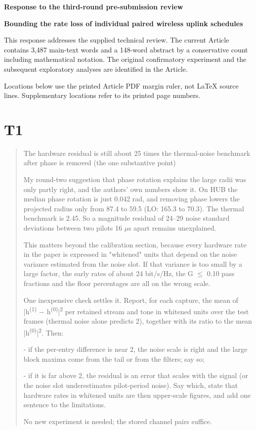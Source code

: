 \documentclass[10pt,letterpaper]{article}
\begin{document}
\begin{center}\Large\bfseries Response to the third-round pre-submission review\end{center}

\textbf{Bounding the rate loss of individual paired wireless uplink schedules}

This response addresses the supplied technical review. The current Article contains 3,487 main-text words and a 148-word abstract by a conservative count including mathematical notation. The original confirmatory experiment and the subsequent exploratory analyses are identified in the Article.

Locations below use the printed Article PDF margin ruler, not LaTeX source lines. Supplementary locations refer to its printed page numbers.

\section*{T1}

\begin{quote}\small The hardware residual is still about 25 times the thermal-noise benchmark after phase is removed (the one substantive point)

My round-two suggestion that phase rotation explains the large radii was only partly right, and the authors' own numbers show it. On HUB the median phase rotation is just 0.042 rad, and removing phase lowers the projected radius only from 87.4 to 59.5 (LO: 165.3 to 70.3). The thermal benchmark is 2.45. So a magnitude residual of 24–29 noise standard deviations between two pilots 16 \(\mu\)s apart remains unexplained.

This matters beyond the calibration section, because every hardware rate in the paper is expressed in "whitened" units that depend on the noise variance estimated from the noise slot. If that variance is too small by a large factor, the early rates of about 24 bit/s/Hz, the G \(\leq\) 0.10 pass fractions and the floor percentages are all on the wrong scale.

One inexpensive check settles it. Report, for each capture, the mean of |h\textsuperscript{(}\textsuperscript{1}\textsuperscript{)} \(-\) h\textsuperscript{(}\textsuperscript{0}\textsuperscript{)}|\textsuperscript{2} per retained stream and tone in whitened units over the test frames (thermal noise alone predicts 2), together with its ratio to the mean |h\textsuperscript{(}\textsuperscript{0}\textsuperscript{)}|\textsuperscript{2}. Then:
\par\noindent - if the per-entry difference is near 2, the noise scale is right and the large block maxima come from the tail or from the filters; say so;
\par\noindent - if it is far above 2, the residual is an error that scales with the signal (or the noise slot underestimates pilot-period noise). Say which, state that hardware rates in whitened units are then upper-scale figures, and add one sentence to the limitations.

No new experiment is needed; the stored channel pairs suffice.\end{quote}
\end{document}
